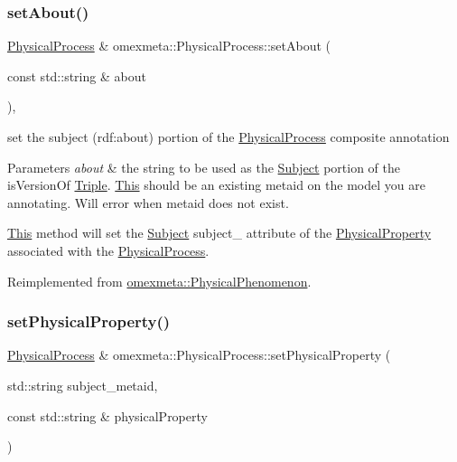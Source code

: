 \subsubsection{\texorpdfstring{set\+About()}{setAbout()}}
{\footnotesize\ttfamily \hyperlink{classomexmeta_1_1PhysicalProcess}{Physical\+Process} \& omexmeta\+::\+Physical\+Process\+::set\+About (\begin{DoxyParamCaption}\item[{const std\+::string \&}]{about }\end{DoxyParamCaption})\hspace{0.3cm}{\ttfamily [override]}, {\ttfamily [virtual]}}



set the subject (rdf\+:about) portion of the \hyperlink{classomexmeta_1_1PhysicalProcess}{Physical\+Process} composite annotation 


\begin{DoxyParams}{Parameters}
{\em about} & the string to be used as the \hyperlink{classomexmeta_1_1Subject}{Subject} portion of the is\+Version\+Of \hyperlink{classomexmeta_1_1Triple}{Triple}. \hyperlink{classThis}{This} should be an existing metaid on the model you are annotating. Will error when metaid does not exist.\\
\hline
\end{DoxyParams}
\hyperlink{classThis}{This} method will set the \hyperlink{classomexmeta_1_1Subject}{Subject} subject\+\_\+ attribute of the \hyperlink{classomexmeta_1_1PhysicalProperty}{Physical\+Property} associated with the \hyperlink{classomexmeta_1_1PhysicalProcess}{Physical\+Process}. 

Reimplemented from \hyperlink{classomexmeta_1_1PhysicalPhenomenon}{omexmeta\+::\+Physical\+Phenomenon}.

\mbox{\label{classomexmeta_1_1PhysicalProcess_ac875058d67408246aa28cf58dd77ccf6}} 
\subsubsection{\texorpdfstring{set\+Physical\+Property()}{setPhysicalProperty()}\hspace{0.1cm}{\footnotesize\ttfamily [1/2]}}
{\footnotesize\ttfamily \hyperlink{classomexmeta_1_1PhysicalProcess}{Physical\+Process} \& omexmeta\+::\+Physical\+Process\+::set\+Physical\+Property (\begin{DoxyParamCaption}\item[{std\+::string}]{subject\+\_\+metaid,  }\item[{const std\+::string \&}]{physical\+Property }\end{DoxyParamCaption})}



